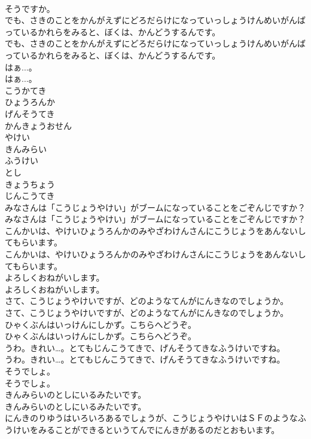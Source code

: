 \documentclass[8pt]{extreport}
\begin{document}
\begin{CJK}{UTF8}{min}
\\	そうですか。
\\	でも、さきのことをかんがえずにどろだらけになっていっしょうけんめいがんばっているかれらをみると、ぼくは、かんどうするんです。
\\	でも、さきのことをかんがえずにどろだらけになっていっしょうけんめいがんばっているかれらをみると、ぼくは、かんどうするんです。
\\	はぁ...。
\\	はぁ...。
\\	こうかてき
\\	ひょうろんか
\\	げんそうてき
\\	かんきょうおせん
\\	やけい
\\	きんみらい
\\	ふうけい
\\	とし
\\	きょうちょう
\\	じんこうてき
\\	みなさんは「こうじょうやけい」がブームになっていることをごぞんじですか？
\\	みなさんは「こうじょうやけい」がブームになっていることをごぞんじですか？
\\	こんかいは、やけいひょうろんかのみやざわけんさんにこうじょうをあんないしてもらいます。
\\	こんかいは、やけいひょうろんかのみやざわけんさんにこうじょうをあんないしてもらいます。
\\	よろしくおねがいします。
\\	よろしくおねがいします。
\\	さて、こうじょうやけいですが、どのようなてんがにんきなのでしょうか。
\\	さて、こうじょうやけいですが、どのようなてんがにんきなのでしょうか。
\\	ひゃくぶんはいっけんにしかず。こちらへどうぞ。
\\	ひゃくぶんはいっけんにしかず。こちらへどうぞ。
\\	うわ。きれい…。とてもじんこうてきで、げんそうてきなふうけいですね。
\\	うわ。きれい…。とてもじんこうてきで、げんそうてきなふうけいですね。
\\	そうでしょ。
\\	そうでしょ。
\\	きんみらいのとしにいるみたいです。
\\	きんみらいのとしにいるみたいです。
\\	にんきのりゆうはいろいろあるでしょうが、こうじょうやけいはＳＦのようなふうけいをみることができるというてんでにんきがあるのだとおもいます。

\end{CJK}
\end{document}
